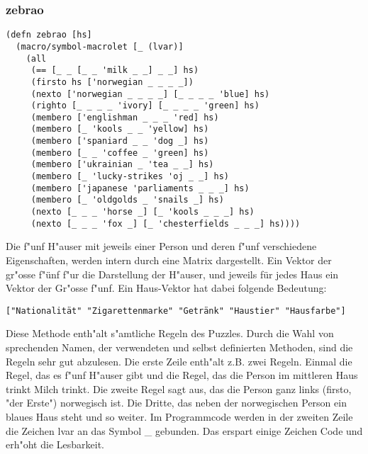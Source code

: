 \subsubsection{zebrao}

\begin{lstlisting}
(defn zebrao [hs]
  (macro/symbol-macrolet [_ (lvar)]
    (all
     (== [_ _ [_ _ 'milk _ _] _ _] hs)
     (firsto hs ['norwegian _ _ _ _])
     (nexto ['norwegian _ _ _ _] [_ _ _ _ 'blue] hs)
     (righto [_ _ _ _ 'ivory] [_ _ _ _ 'green] hs)
     (membero ['englishman _ _ _ 'red] hs)
     (membero [_ 'kools _ _ 'yellow] hs)
     (membero ['spaniard _ _ 'dog _] hs)
     (membero [_ _ 'coffee _ 'green] hs)
     (membero ['ukrainian _ 'tea _ _] hs)
     (membero [_ 'lucky-strikes 'oj _ _] hs)
     (membero ['japanese 'parliaments _ _ _] hs)
     (membero [_ 'oldgolds _ 'snails _] hs)
     (nexto [_ _ _ 'horse _] [_ 'kools _ _ _] hs)
     (nexto [_ _ _ 'fox _] [_ 'chesterfields _ _ _] hs))))
\end{lstlisting}

Die f"unf H"auser mit jeweils einer Person und deren f"unf verschiedene Eigenschaften, werden intern durch eine Matrix dargestellt. Ein Vektor der gr"oss{}e f"ünf f"ur die Darstellung der H"auser, und jeweils für jedes Haus ein Vektor der Gr"oss{}e f"unf. Ein \dq{}Haus-Vektor\dq{} hat dabei folgende Bedeutung:

\begin{lstlisting}
["Nationalität" "Zigarettenmarke" "Getränk" "Haustier" "Hausfarbe"]
\end{lstlisting}

Diese Methode enth"alt s"amtliche Regeln des Puzzles. Durch die Wahl von sprechenden Namen, der verwendeten und selbst definierten Methoden, sind die Regeln sehr gut abzulesen. Die erste Zeile enth"alt z.B. zwei Regeln. Einmal die Regel, das es f"unf H"auser gibt und die Regel, das die Person im mittleren Haus trinkt Milch trinkt. Die zweite Regel sagt aus, das die Person ganz links (firsto, "der Erste") norwegisch ist. Die Dritte, das neben der norwegischen Person ein blaues Haus steht und so weiter.
Im Programmcode werden in der zweiten Zeile die Zeichen \dq{}lvar\dq{} an das Symbol \dq{}\_\dq{} gebunden. Das erspart einige Zeichen Code und erh"oht die Lesbarkeit.
